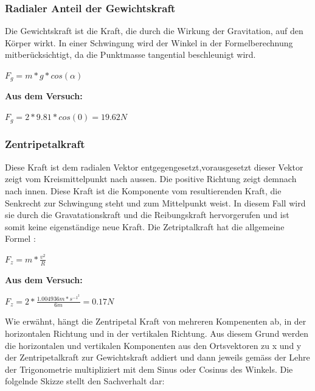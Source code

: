 \documentclass[../main.tex]{subfiles}
\begin{document}
\subsubsection{Radialer Anteil der Gewichtskraft}
Die Gewichtskraft ist die Kraft, die durch die Wirkung der Gravitation, auf den Körper wirkt. In einer Schwingung wird der Winkel in der Formelberechnung mitberücksichtigt, da die Punktmasse tangential beschleunigt wird.\cite{tiplerpaula.PhysikFurStudierende}
\begin{mdframed}
$F_g = m * g * cos(\alpha)$
\end{mdframed}
\textbf {Aus dem Versuch:}
\begin{mdframed}
$F_g = 2 * 9.81 * cos(0) = 19.62N$
\end{mdframed}
\subsubsection{Zentripetalkraft}
Diese Kraft ist dem radialen Vektor entgegengesetzt,vorausgesetzt dieser Vektor zeigt vom Kreismittelpunkt nach aussen. Die positive Richtung zeigt demnach nach innen. Diese Kraft ist die Komponente vom resultierenden Kraft, die Senkrecht zur Schwingung steht und zum Mittelpunkt weist. In diesem Fall wird sie durch die Gravatationskraft und die Reibungskraft hervorgerufen und ist somit keine eigenständige neue Kraft.
Die Zetriptalkraft hat die allgemeine Formel \cite{tiplerpaula.PhysikFurStudierende}:
\begin{mdframed}
$F_z=m * \frac{v^2}{R} $
\end{mdframed}
\textbf {Aus dem Versuch:}
\begin{mdframed}
$F_z = 2 * \frac{1.004936m*s^{-1}^2}{6m} = 0.17N$
\end{mdframed}
Wie erwähnt, hängt die Zentripetal Kraft von mehreren Kompenenten ab, in der horizontalen Richtung und in der vertikalen Richtung. Aus diesem Grund werden die horizontalen und vertikalen Komponenten aus den Ortsvektoren zu x und y der Zentripetalkraft zur Gewichtskraft addiert und dann jeweils gemäss der Lehre der Trigonometrie multipliziert mit dem Sinus oder Cosinus des Winkels. Die folgelnde Skizze stellt den Sachverhalt dar:
\end{document}
